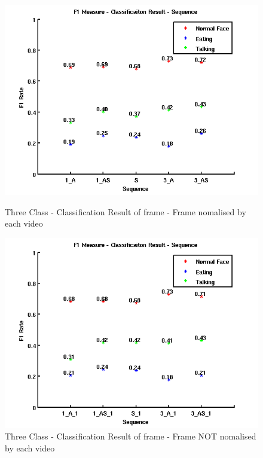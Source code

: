 \begin{figure}[ht]
\centering
\begin{minipage}{.5\textwidth}
  \centering
  \captionsetup{justification=centering,margin=1cm}
  \includegraphics[width=\linewidth]{imgs/Result_F1_Sequence.png}
  \caption{Three Class - Classification Result of frame - Frame nomalised by each video}
  \label{fig:RFS}
\end{minipage}%
\begin{minipage}{.5\textwidth}
  \centering
  \captionsetup{justification=centering,margin=1cm}
  \includegraphics[width=\linewidth]{imgs/Result_F1_Sequence_1.png}
  \caption{Three Class - Classification Result of frame - Frame NOT nomalised by each video}
  \label{fig:RFS1}
\end{minipage}
\end{figure}